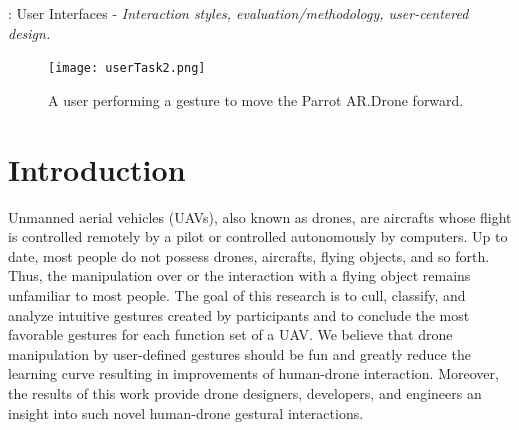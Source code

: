 \documentclass{sigchi}
\begin{document}

: User Interfaces - \emph{Interaction styles, evaluation/methodology, user-centered design.}

\begin{figure}[!h]
\centering
\texttt{[image: userTask2.png]}
\caption{A user performing a gesture to move the Parrot AR.Drone forward.}
\label{fig:userTask2}
\end{figure}

\section{Introduction}

Unmanned aerial vehicles (UAVs), also known as drones, are aircrafts whose flight is controlled remotely by a pilot or controlled autonomously by computers. Up to date, most people do not possess drones, aircrafts, flying objects, and so forth. Thus, the manipulation over or the interaction with a flying object remains unfamiliar to most people. The goal of this research is to cull, classify, and analyze intuitive gestures created by participants and to conclude the most favorable gestures for each function set of a UAV. We believe that drone manipulation by user-defined gestures should be fun and greatly reduce the learning curve resulting in improvements of human-drone interaction. Moreover, the results of this work provide drone designers, developers, and engineers an insight into such novel human-drone gestural interactions.
\end{document}
